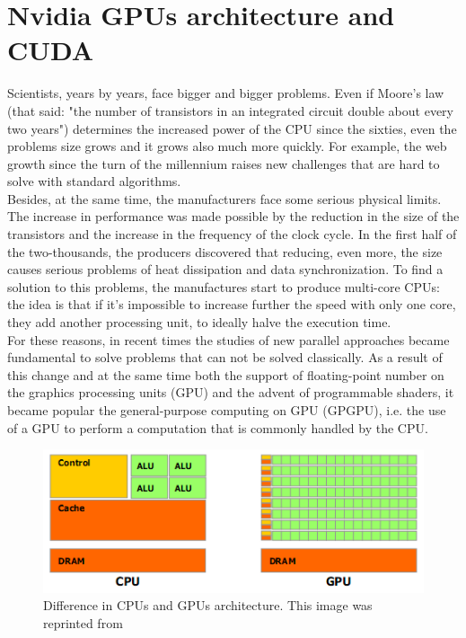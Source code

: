 \section{Nvidia GPUs architecture and CUDA}
Scientists, years by years, face bigger and bigger problems. 
Even if Moore's law (that said: "the number of transistors in an integrated circuit double about every two years") determines the increased power of the CPU since the sixties, even the problems size grows and it grows also much more quickly. For example, the web growth since the turn of the millennium raises new challenges that are hard to solve with standard algorithms.  \\
Besides, at the same time, the manufacturers face some serious physical limits. The increase in performance was made possible by the reduction in the size of the transistors and the increase in the frequency of the clock cycle. In the first half of the two-thousands, the producers discovered that reducing, even more, the size causes serious problems of heat dissipation and data synchronization. To find a solution to this problems, the manufactures start to produce multi-core CPUs: the idea is that if it's impossible to increase further the speed with only one core, they add another processing unit, to ideally halve the execution time.\\
For these reasons, in recent times the studies of new parallel approaches became fundamental to solve problems that can not be solved classically. As a result of this change and at the same time both the support of floating-point number on the graphics processing units (GPU) and the advent of programmable shaders, it became popular the general-purpose computing on GPU (GPGPU), i.e. the use of a GPU to perform a computation that is commonly handled by the CPU.\\
\begin{figure}[h]
	\centering
	\includegraphics[width=0.7\linewidth]{0-resources/cpugpuhardware}
	\caption{Difference in CPUs and GPUs architecture. This image was reprinted from \cite{cuda_manual} }
	\label{fig:cpugpuhardware}
\end{figure}
\\
